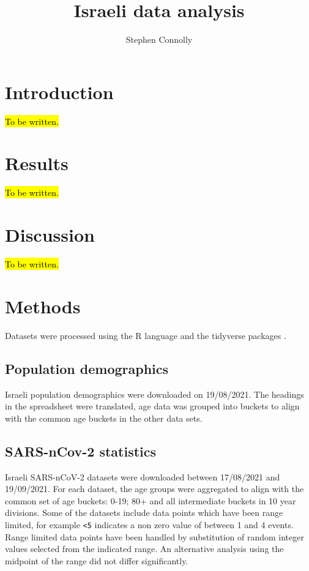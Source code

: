 \documentclass[fleqn,10pt]{wlscirep}
\title{Israeli data analysis}
\author[1,*]{Stephen Connolly}
\affil[1]{Independent Researcher, Dublin, Ireland}
\affil[*]{stephen alan connolly at gmail com}
\begin{document}
\flushbottom
\maketitle
%
%
\thispagestyle{empty}

\section*{Introduction}

\hl{To be written.}

\section*{Results}

\hl{To be written.}

\section*{Discussion}

\hl{To be written.}

\section*{Methods}

Datasets were processed using the R language \cite{RLanguage:2020} and the tidyverse packages \cite{Tidyverse:2019}.

\subsection*{Population demographics}

Israeli population demographics\cite{CbsGovIl:2021} were downloaded on 19/08/2021.
The headings in the spreadsheet were translated, age data was grouped into buckets to align with the common age buckets in the other data sets.

\subsection*{SARS-nCov-2 statistics}

Israeli SARS-nCoV-2 datasets\cite{DataGovIl:2021} were downloaded between 17/08/2021 and 19/09/2021.
For each dataset, the age groups were aggregated to align with the common set of age buckets: 0-19; 80+ and all intermediate buckets in 10 year divisions.
Some of the datasets include data points which have been range limited, for example \texttt{<5} indicates a non zero value of between 1 and 4 events.
Range limited data points have been handled by substitution of random integer values selected from the indicated range.
An alternative analysis using the midpoint of the range did not differ significantly.
\end{document}
